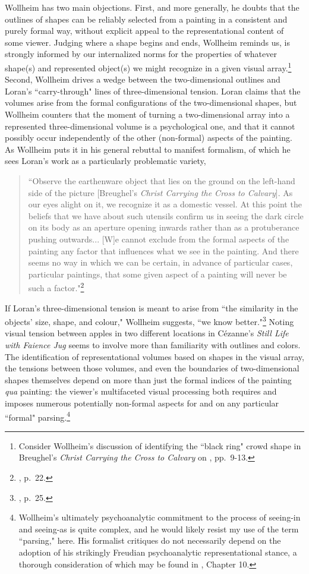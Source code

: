 Wollheim has two main objections.  First, and more generally, he doubts that the outlines of shapes can be reliably selected from a painting in a consistent and purely formal way, without explicit appeal to the representational content of some viewer.  Judging where a shape begins and ends, Wollheim reminds us, is strongly informed by our internalized norms for the properties of whatever shape(s) and represented object(s) we might recognize in a given visual array.\footnote{Consider Wollheim's discussion of identifying the ``black ring" crowd shape in Breughel's \emph{Christ Carrying the Cross to Calvary} on \cite{wollheim1995}, pp.\ 9-13.}  Second, Wollheim drives a wedge between the two-dimensional outlines and Loran's ``carry-through" lines of three-dimensional tension.  Loran claims that the volumes arise from the formal configurations of the two-dimensional shapes, but Wollheim counters that the moment of turning a two-dimensional array into a represented three-dimensional volume is a psychological one, and that it cannot possibly occur independently of the other (non-formal) aspects of the painting.  As Wollheim puts it in his general rebuttal to manifest formalism, of which he sees Loran's work as a particularly problematic variety,
\begin{quote}
``Observe the earthenware object that lies on the ground on the left-hand side of the picture [Breughel's \emph{Christ Carrying the Cross to Calvary}].  As our eyes alight on it, we recognize it as a domestic vessel.  At this point the beliefs that we have about such utensils confirm us in seeing the dark circle on its body as an aperture opening inwards rather than as a protuberance pushing outwards... [W]e cannot exclude from the formal aspects of the painting any factor that influences what we see in the painting.  And there seems no way in which we can be certain, in advance of particular cases, particular paintings, that some given aspect of a painting will never be such a factor."\footnote{\cite{wollheim1995}, p.\ 22.}
\end{quote}
If Loran's three-dimensional tension is meant to arise from ``the similarity in the objects' size, shape, and colour," Wollheim suggests, ``we know better."\footnote{\cite{wollheim1995}, p.\ 25.}  Noting visual tension between apples in two different locations in C\'{e}zanne's \emph{Still Life with Faience Jug} seems to involve more than familiarity with outlines and colors.  The identification of representational volumes based on shapes in the visual array, the tensions between those volumes, and even the boundaries of two-dimensional shapes themselves depend on more than just the formal indices of the painting \emph{qua} painting: the viewer's multifaceted visual processing both requires and imposes numerous potentially non-formal aspects for and on any particular ``formal" parsing.\footnote{Wollheim's ultimately psychoanalytic commitment to the process of seeing-in and seeing-as is quite complex, and he would likely resist my use of the term ``parsing," here.  His formalist critiques do not necessarily depend on the adoption of his strikingly Freudian psychoanalytic representational stance, a thorough consideration of which may be found in \cite{davis2010queer}, Chapter 10.}


